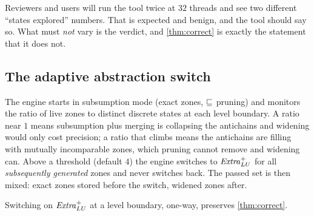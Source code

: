 \begin{remark}
Reviewers and users will run the tool twice at $32$ threads and see two
different ``states explored'' numbers.  That is expected and benign, and the
tool should say so.  What must \emph{not} vary is the verdict, and
\cref{thm:correct} is exactly the statement that it does not.
\end{remark}

\subsection{The adaptive abstraction switch}

The engine starts in subsumption mode (exact zones, $\sqsubseteq$ pruning) and
monitors the ratio of live zones to distinct discrete states at each level
boundary.  A ratio near $1$ means subsumption plus merging is collapsing the
antichains and widening would only cost precision; a ratio that climbs means the
antichains are filling with mutually incomparable zones, which pruning cannot
remove and widening can.  Above a threshold (default $4$) the engine switches to
$\mathit{Extra}^{+}_{LU}$ for all \emph{subsequently generated} zones and never switches back.
The passed set is then mixed: exact zones stored before the switch, widened
zones after.

\begin{theorem}\label{thm:adapt}
Switching on $\mathit{Extra}^{+}_{LU}$ at a level boundary, one-way, preserves
\cref{thm:correct}.
\end{theorem}

